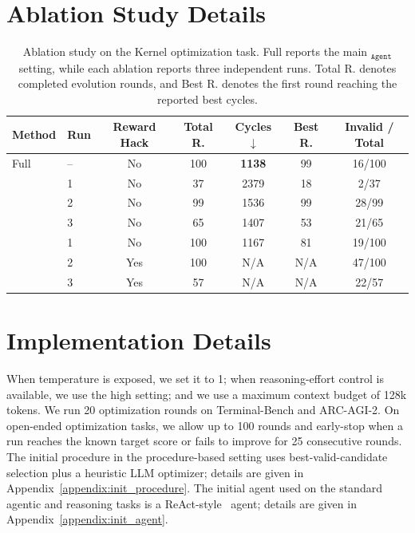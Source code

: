 \section{Ablation Study Details}
\label{appendix:ablation}

\begin{table}[h]
\caption{
Ablation study on the Kernel optimization task.
Full reports the main \ourmethod$_{\texttt{Agent}}$ setting, while each ablation reports three independent runs.
Total R. denotes completed evolution rounds, and Best R. denotes the first round reaching the reported best cycles.
}
\label{tab:ablation}
\centering
\small
\setlength{\tabcolsep}{3.6pt}
\renewcommand{\arraystretch}{1.15}

\begin{tabular}{llccccc}
\toprule[1.2pt]
\textbf{Method}
& \textbf{Run}
& \textbf{Reward Hack}
& \textbf{Total R.}
& \textbf{Cycles $\downarrow$}
& \textbf{Best R.}
& \textbf{Invalid / Total} \\
\midrule[0.8pt]

Full
& --
& No
& 100
& \textbf{1138}
& 99
& 16/100 \\

\midrule[0.3pt]

& 1 & No & 37 & 2379 & 18 & 2/37 \\
& 2 & No & 99 & 1536 & 99 & 28/99 \\
& 3 & No & 65 & 1407 & 53 & 21/65 \\

\midrule[0.3pt]

& 1 & No  & 100 & 1167 & 81 & 19/100 \\
& 2 & Yes & 100 & N/A  & N/A & 47/100 \\
& 3 & Yes & 57  & N/A  & N/A & 22/57 \\

\bottomrule[1.2pt]
\end{tabular}
\end{table}

\section{Implementation Details}
\label{appendix:impl_details}

When temperature is exposed, we set it to 1; when reasoning-effort control is available, we use the high setting; and we use a maximum context budget of 128k tokens. We run 20 optimization rounds on Terminal-Bench and ARC-AGI-2. On open-ended optimization tasks, we allow up to 100 rounds and early-stop when a run reaches the known target score or fails to improve for 25 consecutive rounds. The initial procedure in the procedure-based setting uses best-valid-candidate selection plus a heuristic LLM optimizer; details are given in Appendix~\ref{appendix:init_procedure}. The initial agent used on the standard agentic and reasoning tasks is a ReAct-style~\citep{yao2022react} agent; details are given in Appendix~\ref{appendix:init_agent}.

